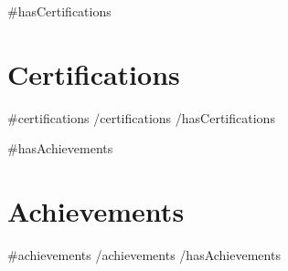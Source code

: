 {{#hasCertifications}}
\section{Certifications}
\resumeSubHeadingListStart
  {{#certifications}}
  {{/certifications}}
\resumeSubHeadingListEnd
{{/hasCertifications}}

{{#hasAchievements}}
\section{Achievements}
\resumeSubHeadingListStart
  {{#achievements}}
  {{/achievements}}
\resumeSubHeadingListEnd
{{/hasAchievements}}
